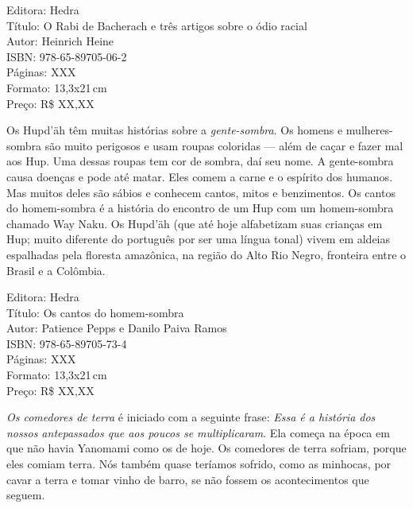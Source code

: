 \begin{ficha}
Editora: Hedra\\
Título: O Rabi de Bacherach e três artigos sobre o ódio racial\\
Autor: Heinrich Heine\\ 
ISBN: 978-65-89705-06-2\\
Páginas: XXX\\
Formato: 13,3x21\,cm\\
Preço: R\$ XX,XX\\
\end{ficha}

\pagebreak


\noindent{}Os Hupd’äh têm muitas histórias sobre a \textit{gente-sombra}. Os homens e mulheres-sombra são muito perigosos e usam roupas coloridas --- além de caçar e fazer mal aos Hup. Uma dessas roupas tem cor de sombra, daí seu nome. A gente-sombra causa doenças e pode até matar. Eles comem a carne e o espírito dos humanos. Mas muitos deles são sábios e conhecem cantos, mitos e benzimentos. Os cantos do homem-sombra é a história do encontro de um Hup com um homem-sombra chamado Way Naku. Os Hupd’äh (que até hoje alfabetizam suas crianças em Hup; muito diferente do português por ser uma língua tonal) vivem em aldeias espalhadas pela floresta amazônica, na região do Alto Rio Negro, fronteira entre o Brasil e a Colômbia.

\begin{ficha}
Editora: Hedra\\
Título: Os cantos do homem-sombra\\
Autor: Patience Pepps e Danilo Paiva Ramos\\ 
ISBN: 978-65-89705-73-4\\
Páginas: XXX\\
Formato: 13,3x21\,cm\\
Preço: R\$ XX,XX\\
\end{ficha}

\pagebreak


\noindent{}\textit{Os comedores de terra} é iniciado com a seguinte frase: \textit{Essa é a história dos nossos antepassados que aos poucos se multiplicaram}. Ela começa na época em que não havia Yanomami como os de hoje. Os comedores de terra sofriam, porque eles comiam terra. Nós também quase teríamos sofrido, como as minhocas, por cavar a terra e tomar vinho de barro, se não fossem os acontecimentos que seguem.

